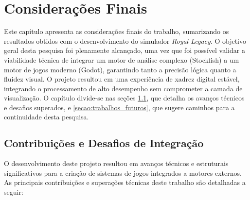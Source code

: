 \chapter{Considerações Finais}
\label{capitulo:consideracoes_finais}

Este capítulo apresenta as considerações finais do trabalho, sumarizando os resultados obtidos com o desenvolvimento do simulador \textit{Royal Legacy}. O objetivo geral desta pesquisa foi plenamente alcançado, uma vez que foi possível validar a viabilidade técnica de integrar um motor de análise complexo (Stockfish) a um motor de jogos moderno (Godot), garantindo tanto a precisão lógica quanto a fluidez visual. O projeto resultou em uma experiência de xadrez digital estável, integrando o processamento de alto desempenho sem comprometer a camada de visualização. O capítulo divide-se nas seções \ref{secao:contribuicoes}, que detalha os avanços técnicos e desafios superados, e \ref{secao:trabalhos_futuros}, que sugere caminhos para a continuidade desta pesquisa.

\section{Contribuições e Desafios de Integração}
\label{secao:contribuicoes}

O desenvolvimento deste projeto resultou em avanços técnicos e estruturais significativos para a criação de sistemas de jogos integrados a motores externos. As principais contribuições e superações técnicas deste trabalho são detalhadas a seguir:

